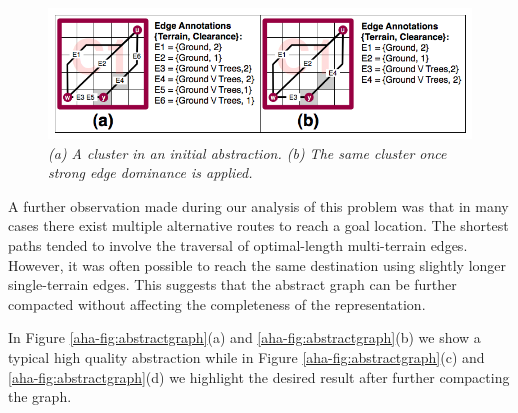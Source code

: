 \begin{figure}[htbp]
	\vspace{-9pt}
        \caption{\emph{(a) A cluster in an initial abstraction. (b) The same cluster once strong edge dominance is applied.} \vspace{0.5em} }
        \begin{center}
                        \includegraphics[scale=0.33, trim = 20mm 5mm 20mm 0mm]{diagrams/intraedges_initial.png}
        \end{center}
        \label{aha-fig:strongdominance}
	\vspace{-9pt}
\end{figure}
A further observation made during our analysis of this problem was that in many cases there exist multiple alternative routes to reach a goal location.
The shortest paths tended to involve the traversal of optimal-length multi-terrain edges. However, it was often possible to reach the same destination using slightly longer single-terrain edges.
This suggests that the abstract graph can be further compacted without affecting the completeness of the representation.
\par \indent
In Figure \ref{aha-fig:abstractgraph}(a) and \ref{aha-fig:abstractgraph}(b) we show a typical high quality abstraction while in Figure \ref{aha-fig:abstractgraph}(c) and \ref{aha-fig:abstractgraph}(d) we highlight the desired result after further compacting the graph.
